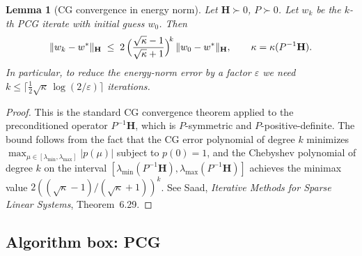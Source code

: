 \documentclass[12pt]{article}
\newtheorem{lemma}[theorem]{Lemma}
\theoremstyle{definition}
\begin{document}
\begin{lemma}[CG convergence in energy norm]\label{lem:cg-rate}
Let $\mathbf{H}\succ 0$, $P\succ 0$. Let $w_k$ be the $k$-th PCG iterate with initial guess
$w_0$. Then
\begin{equation}\label{eq:cg-rate}
\|w_k-w^*\|_{\mathbf{H}}
\;\leq\; 2\,\Bigl(\frac{\sqrt{\kappa}-1}{\sqrt{\kappa}+1}\Bigr)^{\!k}
\,\|w_0-w^*\|_{\mathbf{H}},
\qquad \kappa=\kappa(P^{-1}\mathbf{H}).
\end{equation}
In particular, to reduce the energy-norm error by a factor $\varepsilon$ we need
$k\leq\lceil \tfrac{1}{2}\sqrt{\kappa}\,\log(2/\varepsilon)\rceil$ iterations.
\end{lemma}

\begin{proof}
This is the standard CG convergence theorem applied to the preconditioned operator
$P^{-1}\mathbf{H}$, which is $P$-symmetric and $P$-positive-definite. The bound follows from the
fact that the CG error polynomial of degree $k$ minimizes
$\max_{\mu\in[\lambda_{\min},\lambda_{\max}]}|p(\mu)|$ subject to $p(0)=1$, and the Chebyshev
polynomial of degree $k$ on the interval
$[\lambda_{\min}(P^{-1}\mathbf{H}),\lambda_{\max}(P^{-1}\mathbf{H})]$ achieves the minimax value
$2((\sqrt\kappa-1)/(\sqrt\kappa+1))^k$. See Saad,
\emph{Iterative Methods for Sparse Linear Systems}, Theorem~6.29.
\end{proof}

\subsection{Algorithm box: PCG}
\end{document}
